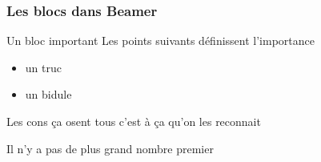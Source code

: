 
\begin{frame}[fragile]
  \frametitle{Les blocs dans Beamer}

  
  \begin{block}{Un bloc important}
    Les points suivants définissent l'importance

    \begin{itemize}
    \item un truc
    \item un bidule
    \end{itemize}
    
  \end{block}

  \pause  


  \begin{definition}
    Les cons ça osent tous c'est à ça qu'on les reconnait
  \end{definition}

  \begin{theorem}
    Il n'y a pas de plus grand nombre premier
  \end{theorem}
\end{frame}


